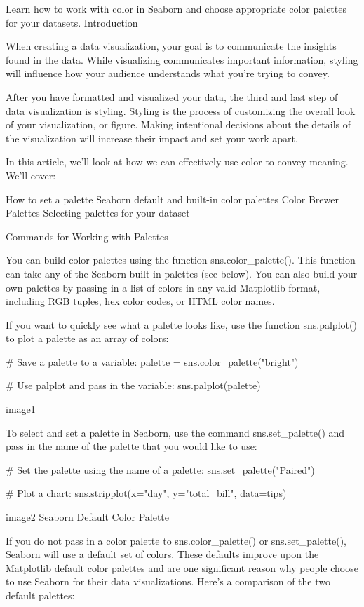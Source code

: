 \documentclass{journal}
\begin{document}
Learn how to work with color in Seaborn and choose appropriate color palettes for your datasets.
Introduction

When creating a data visualization, your goal is to communicate the insights found in the data. While visualizing communicates important information, styling will influence how your audience understands what you’re trying to convey.

After you have formatted and visualized your data, the third and last step of data visualization is styling. Styling is the process of customizing the overall look of your visualization, or figure. Making intentional decisions about the details of the visualization will increase their impact and set your work apart.

In this article, we’ll look at how we can effectively use color to convey meaning. We’ll cover:

    How to set a palette
    Seaborn default and built-in color palettes
    Color Brewer Palettes
    Selecting palettes for your dataset

Commands for Working with Palettes

You can build color palettes using the function sns.color_palette(). This function can take any of the Seaborn built-in palettes (see below). You can also build your own palettes by passing in a list of colors in any valid Matplotlib format, including RGB tuples, hex color codes, or HTML color names.

If you want to quickly see what a palette looks like, use the function sns.palplot() to plot a palette as an array of colors:

# Save a palette to a variable:
palette = sns.color_palette("bright")

# Use palplot and pass in the variable:
sns.palplot(palette)

image1

To select and set a palette in Seaborn, use the command sns.set_palette() and pass in the name of the palette that you would like to use:

# Set the palette using the name of a palette:
sns.set_palette("Paired")

# Plot a chart:
sns.stripplot(x="day", y="total_bill", data=tips)

image2
Seaborn Default Color Palette

If you do not pass in a color palette to sns.color_palette() or sns.set_palette(), Seaborn will use a default set of colors. These defaults improve upon the Matplotlib default color palettes and are one significant reason why people choose to use Seaborn for their data visualizations. Here’s a comparison of the two default palettes:
\end{document}
